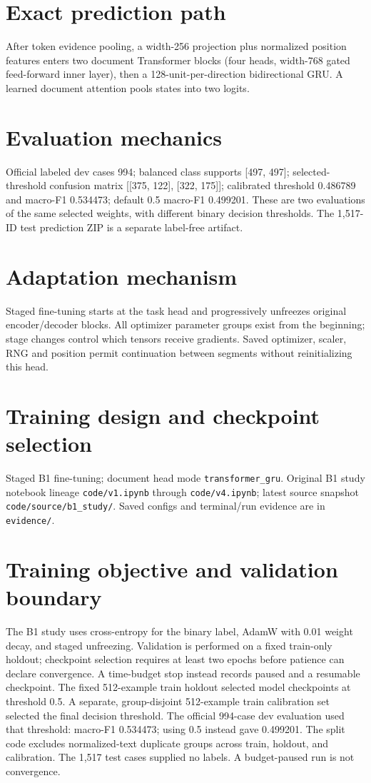 \documentclass[11pt,a4paper]{article}
\begin{document}
\section{Exact prediction path}
After token evidence pooling, a width-256 projection plus normalized position features enters two document Transformer blocks (four heads, width-768 gated feed-forward inner layer), then a 128-unit-per-direction bidirectional GRU. A learned document attention pools states into two logits.
\section{Evaluation mechanics}
Official labeled dev cases 994; balanced class supports [497, 497]; selected-threshold confusion matrix [[375, 122], [322, 175]]; calibrated threshold 0.486789 and macro-F1 0.534473; default 0.5 macro-F1 0.499201. These are two evaluations of the same selected weights, with different binary decision thresholds. The 1,517-ID test prediction ZIP is a separate label-free artifact.
\section{Adaptation mechanism}
Staged fine-tuning starts at the task head and progressively unfreezes original encoder/decoder blocks. All optimizer parameter groups exist from the beginning; stage changes control which tensors receive gradients. Saved optimizer, scaler, RNG and position permit continuation between segments without reinitializing this head.
\section{Training design and checkpoint selection}
Staged B1 fine-tuning; document head mode \texttt{transformer\_gru}. Original B1 study notebook lineage \texttt{code/v1.ipynb} through \texttt{code/v4.ipynb}; latest source snapshot \texttt{code/source/b1\_study/}. Saved configs and terminal/run evidence are in \texttt{evidence/}.
\section{Training objective and validation boundary}
The B1 study uses cross-entropy for the binary label, AdamW with 0.01 weight decay, and staged unfreezing. Validation is performed on a fixed train-only holdout; checkpoint selection requires at least two epochs before patience can declare convergence. A time-budget stop instead records paused and a resumable checkpoint. The fixed 512-example train holdout selected model checkpoints at threshold 0.5. A separate, group-disjoint 512-example train calibration set selected the final decision threshold. The official 994-case dev evaluation used that threshold: macro-F1 0.534473; using 0.5 instead gave 0.499201. The split code excludes normalized-text duplicate groups across train, holdout, and calibration. The 1,517 test cases supplied no labels. A budget-paused run is not convergence.
\end{document}
